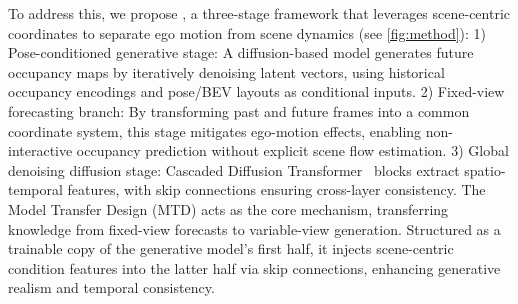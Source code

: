 To address this, we propose \mtd{}, a three-stage framework that leverages scene-centric coordinates to separate ego motion from scene dynamics (see \cref{fig:method}):
1) Pose-conditioned generative stage: A diffusion-based model generates future occupancy maps by iteratively denoising latent vectors, using historical occupancy encodings and pose/BEV layouts as conditional inputs.
2) Fixed-view forecasting branch: By transforming past and future frames into a common coordinate system, this stage mitigates ego-motion effects, enabling non-interactive occupancy prediction without explicit scene flow estimation.
3) Global denoising diffusion stage: Cascaded Diffusion Transformer~\cite{DiT} blocks extract spatio-temporal features, with skip connections ensuring cross-layer consistency.
The Model Transfer Design (MTD) acts as the core mechanism, transferring knowledge from fixed-view forecasts to variable-view generation.
Structured as a trainable copy of the generative model's first half, it injects scene-centric condition features into the latter half via skip connections, enhancing generative realism and temporal consistency.



